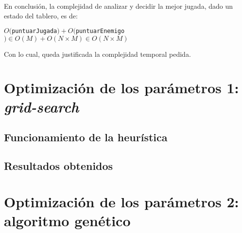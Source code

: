 \documentclass[12pt,a4paper]{article}
\begin{document}
    En conclusión, la complejidad de analizar y decidir la mejor jugada, dado un estado del tablero, es de:
    
    \begin{center}
        $O($\texttt{puntuarJugada}$) + O($\texttt{puntuarEnemigo}$) \in O(M) + O(N \times M) \in O(N \times M)$
    \end{center}
    
    Con lo cual, queda justificada la complejidad temporal pedida.
    
    

\newpage



\section{Optimización de los parámetros 1: \textit{grid-search}}

    \subsection{Funcionamiento de la heurística}
    
    
    
    
    
    
    
    
    
    
    
    \subsection{Resultados obtenidos}



	
	
\newpage

	

\section{Optimización de los parámetros 2: algoritmo genético}



	
	
\newpage

		
\end{document}
